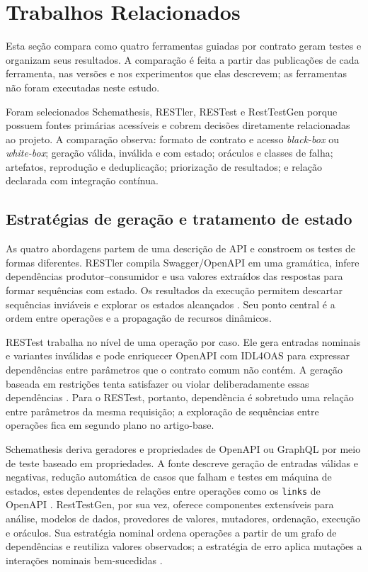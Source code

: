 \section{Trabalhos Relacionados}\label{sec:relacionados}

Esta seção compara como quatro ferramentas guiadas por contrato geram testes
e organizam seus resultados. A comparação é feita a partir das publicações de
cada ferramenta, nas versões e nos experimentos que elas descrevem; as
ferramentas não foram executadas neste estudo.

Foram selecionados Schemathesis, RESTler, RESTest e RestTestGen porque possuem
fontes primárias acessíveis e cobrem decisões diretamente relacionadas ao
projeto. A comparação observa: formato de contrato e acesso \textit{black-box} ou
\textit{white-box}; geração válida, inválida e com estado; oráculos e classes de falha;
artefatos, reprodução e deduplicação; priorização de resultados; e relação
declarada com integração contínua.

\subsection{Estratégias de geração e tratamento de estado}

As quatro abordagens partem de uma descrição de API e constroem os testes de
formas diferentes. RESTler compila Swagger/OpenAPI em uma gramática,
infere dependências produtor--consumidor e usa valores extraídos das respostas
para formar sequências com estado. Os resultados da execução permitem descartar
sequências inviáveis e explorar os estados alcançados
\cite{atlidakis2019restler}. Seu ponto central é a ordem entre operações e a
propagação de recursos dinâmicos.

RESTest trabalha no nível de uma operação por caso. Ele gera entradas nominais
e variantes inválidas e pode enriquecer OpenAPI com IDL4OAS para expressar
dependências entre parâmetros que o contrato comum não contém. A geração
baseada em restrições tenta satisfazer ou violar deliberadamente essas
dependências \cite{martinlopez2020restest}. Para o RESTest, portanto,
dependência é sobretudo uma relação entre parâmetros da mesma requisição; a
exploração de sequências entre operações fica em segundo plano no artigo-base.

Schemathesis deriva geradores e propriedades de OpenAPI ou GraphQL por meio de
teste baseado em propriedades. A fonte descreve geração de entradas válidas e
negativas, redução automática de casos que falham e testes em máquina de
estados, estes dependentes de relações entre operações como os \texttt{links} de
OpenAPI \cite{hatfielddodds2021schemathesis}. RestTestGen, por sua vez, oferece
componentes extensíveis para análise, modelos de dados, provedores de valores,
mutadores, ordenação, execução e oráculos. Sua estratégia nominal ordena
operações a partir de um grafo de dependências e reutiliza valores observados;
a estratégia de erro aplica mutações a interações nominais bem-sucedidas
\cite{corradini2022resttestgen}.


